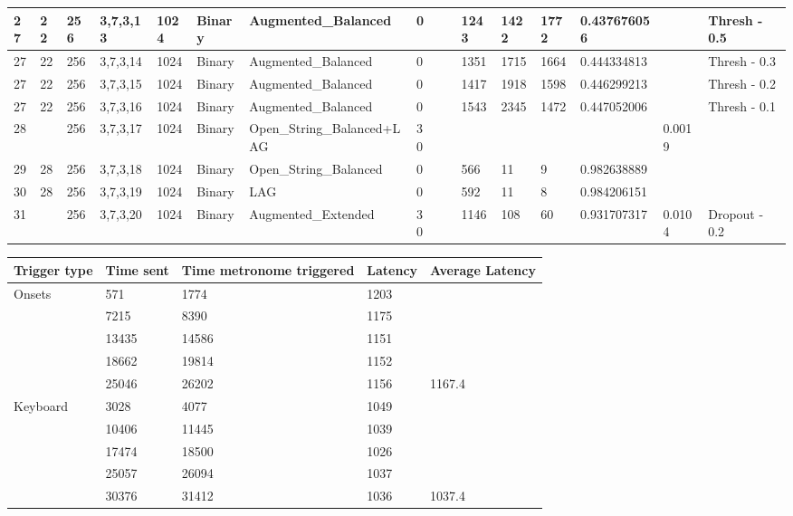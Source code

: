 \documentclass[conference]{IEEEtran}
\begin{document}
\begin{table}[!ht]
\begin{adjustbox}{width=\textwidth}
\begin{tabular}{|l|l|l|l|l|l|l|l|l|l|l|l|l|l|l|}
                27 & 22 & 256 & 3,7,3,13 & 1024 & Binary & Augmented\_Balanced & 0 & ~ & 1243 & 1422 & 1772 & 0.437676056 & ~ & Thresh - 0.5 \\ \hline
                27 & 22 & 256 & 3,7,3,14 & 1024 & Binary & Augmented\_Balanced & 0 & ~ & 1351 & 1715 & 1664 & 0.444334813 & ~ & Thresh - 0.3 \\ \hline
                27 & 22 & 256 & 3,7,3,15 & 1024 & Binary & Augmented\_Balanced & 0 & ~ & 1417 & 1918 & 1598 & 0.446299213 & ~ & Thresh - 0.2 \\ \hline
                27 & 22 & 256 & 3,7,3,16 & 1024 & Binary & Augmented\_Balanced & 0 & ~ & 1543 & 2345 & 1472 & 0.447052006 & ~ & Thresh - 0.1 \\ \hline
                28 & ~ & 256 & 3,7,3,17 & 1024 & Binary & Open\_String\_Balanced+LAG & 30 & ~ & ~ & ~ & ~ & ~ & 0.0019 & ~ \\ \hline
                29 & 28 & 256 & 3,7,3,18 & 1024 & Binary & Open\_String\_Balanced & 0 & ~ & 566 & 11 & 9 & 0.982638889 & ~ & ~ \\ \hline
                30 & 28 & 256 & 3,7,3,19 & 1024 & Binary & LAG & 0 & ~ & 592 & 11 & 8 & 0.984206151 & ~ & ~ \\ \hline
                31 & ~ & 256 & 3,7,3,20 & 1024 & Binary & Augmented\_Extended & 30 & ~ & 1146 & 108 & 60 & 0.931707317 & 0.0104 & Dropout - 0.2 \\ \hline
            \end{tabular}
 \end{adjustbox}
 \end{table}

 \begin{table}[!ht]
    \centering
    \begin{tabular}{|l|l|l|l|l|}
    \hline
        Trigger type & Time sent & Time metronome triggered & Latency & Average Latency \\ \hline
        Onsets & 571 & 1774 & 1203 & ~ \\ \hline
        ~ & 7215 & 8390 & 1175 & ~ \\ \hline
        ~ & 13435 & 14586 & 1151 & ~ \\ \hline
        ~ & 18662 & 19814 & 1152 & ~ \\ \hline
        ~ & 25046 & 26202 & 1156 & 1167.4 \\ \hline
        Keyboard & 3028 & 4077 & 1049 & ~ \\ \hline
        ~ & 10406 & 11445 & 1039 & ~ \\ \hline
        ~ & 17474 & 18500 & 1026 & ~ \\ \hline
        ~ & 25057 & 26094 & 1037 & ~ \\ \hline
        ~ & 30376 & 31412 & 1036 & 1037.4 \\ \hline
    \end{tabular}
\end{table}

 
\end{document}
